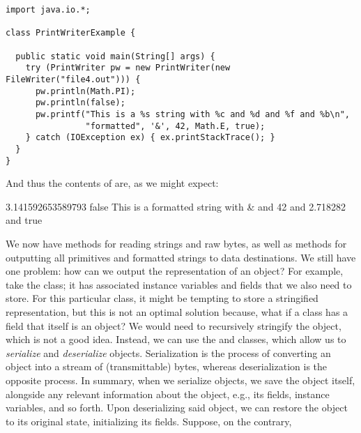 
\begin{lstlisting}[language=MyJava]
import java.io.*;

class PrintWriterExample {
  
  public static void main(String[] args) {
    try (PrintWriter pw = new PrintWriter(new FileWriter("file4.out"))) {
      pw.println(Math.PI);
      pw.println(false);
      pw.printf("This is a %s string with %c and %d and %f and %b\n", 
                "formatted", '&', 42, Math.E, true);
    } catch (IOException ex) { ex.printStackTrace(); }
  }
}
\end{lstlisting}

And thus the contents of  are, as we might expect:

\begin{verbnobox}[\small]
3.141592653589793
false
This is a formatted string with & and 42 and 2.718282 and true
\end{verbnobox}

We now have methods for reading strings and raw bytes, as well as methods for outputting all primitives and formatted strings to data destinations. We still have one problem: how can we output the representation of an object? For example, take the  class; it has associated instance variables and fields that we also need to store. For this particular class, it might be tempting to store a stringified representation, but this is not an optimal solution because, what if a class has a field that itself is an object? We would need to recursively stringify the object, which is not a good idea. Instead, we can use the  and  classes, which allow us to \emph{serialize} and \emph{deserialize} objects. Serialization is the process of converting an object into a stream of (transmittable) bytes, whereas deserialization is the opposite process. In summary, when we serialize objects, we save the object itself, alongside any relevant information about the object, e.g., its fields, instance variables, and so forth. Upon deserializing said object, we can restore the object to its original state, initializing its fields. Suppose, on the contrary,


